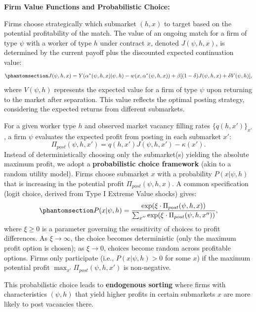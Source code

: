 \documentclass[
  11pt,
  letterpaper,
  DIV=11,
  numbers=noendperiod]{scrartcl}
\theoremstyle{plain}
\theoremstyle{remark}
\begin{document}
\textbf{Firm Value Functions and Probabilistic Choice:}

Firms choose strategically which submarket \((h, x)\) to target based on
the potential profitability of the match. The value of an ongoing match
for a firm of type \(\psi\) with a worker of type \(h\) under contract
\(x\), denoted \(J(\psi, h, x)\), is determined by the current payoff
plus the discounted expected continuation value:
\begin{equation}\phantomsection\label{eq-valueFirmMatch}{ J(\psi, h, x) = Y(\alpha^*(\psi, h, x) | \psi, h) - w(x, \alpha^*(\psi, h, x)) + \beta[(1 - \delta)J(\psi, h, x) + \delta V(\psi, h)], }\end{equation}
where \(V(\psi, h)\) represents the expected value for a firm of type
\(\psi\) upon returning to the market after separation. This value
reflects the optimal posting strategy, considering the expected returns
from different submarkets.

For a given worker type \(h\) and observed market vacancy filling rates
\(\{q(h, x')\}_{x'}\), a firm \(\psi\) evaluates the expected profit
from posting in each submarket \(x'\):
\[ \Pi_{post}(\psi, h, x') = q(h, x') J(\psi, h, x') - \kappa(x'). \]
Instead of deterministically choosing only the submarket(s) yielding the
absolute maximum profit, we adopt a \textbf{probabilistic choice
framework} (akin to a random utility model). Firms choose submarket
\(x\) with a probability \(P(x | \psi, h)\) that is increasing in the
potential profit \(\Pi_{post}(\psi, h, x)\). A common specification
(logit choice, derived from Type I Extreme Value shocks) gives:
\begin{equation}\phantomsection\label{eq-softmaxChoice}{ P(x | \psi, h) = \frac{\exp(\xi \cdot \Pi_{post}(\psi, h, x))}{\sum_{x''} \exp(\xi \cdot \Pi_{post}(\psi, h, x''))}, }\end{equation}
where \(\xi \ge 0\) is a parameter governing the sensitivity of choices
to profit differences. As \(\xi \to \infty\), the choice becomes
deterministic (only the maximum profit option is chosen); as
\(\xi \to 0\), choices become random across profitable options. Firms
only participate (i.e., \(P(x | \psi, h) > 0\) for some \(x\)) if the
maximum potential profit \(\max_{x'} \Pi_{post}(\psi, h, x')\) is
non-negative.

This probabilistic choice leads to \textbf{endogenous sorting} where
firms with characteristics \((\psi, h)\) that yield higher profits in
certain submarkets \(x\) are more likely to post vacancies there.
\end{document}
